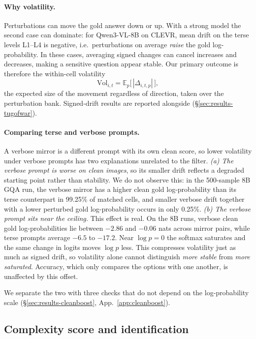 \documentclass[10pt,twocolumn,letterpaper]{article}
\begin{document}
\paragraph{Why volatility.}
Perturbations can move the gold answer down or up. With a strong model
the second case can dominate: for Qwen3-VL-8B on CLEVR, mean drift on the
terse levels L1--L4 is negative, i.e.\ perturbations on average
\emph{raise} the gold log-probability. In these cases, averaging signed changes can cancel increases and decreases, making a sensitive question appear stable. Our
primary outcome is therefore the within-cell volatility
\begin{equation}
  \mathrm{Vol}_{i,t} = \mathbb{E}_p\big[\,|\Delta_{i,t,p}|\,\big],
  \label{eq:vol}
\end{equation}
the expected size of the movement regardless of direction, taken over
the perturbation bank. Signed-drift results are reported alongside
(\S\ref{sec:results-tugofwar}).

\paragraph{Comparing terse and verbose prompts.}\label{sec:confounds}
A verbose mirror is a different prompt with its own clean score, so
lower volatility under verbose prompts has two explanations unrelated
to the filter.
\emph{(a) The verbose prompt is worse on clean images}, so its smaller
drift reflects a degraded starting point rather than stability. We do
not observe this: in the 500-sample 8B GQA run, the verbose mirror has a
higher clean gold log-probability than its terse counterpart in
99.25\% of matched cells, and smaller verbose drift together with a
lower perturbed gold log-probability occurs in only 0.25\%.
\emph{(b) The verbose prompt sits near the ceiling.} This effect is
real. On the 8B runs, verbose clean gold log-probabilities lie between
$-2.86$ and $-0.06$ nats across mirror pairs, while terse prompts
average $-6.5$ to $-17.2$. Near $\log p=0$ the softmax saturates and the
same change in logits moves $\log p$ less. This compresses volatility
just as much as signed drift, so volatility alone cannot distinguish
\emph{more stable} from \emph{more saturated}. Accuracy, which only compares the options with one another, is unaffected by this offset.

We separate the two with three checks that do not depend on the log-probability scale (\S\ref{sec:results-cleanboost}, App.~\ref{app:cleanboost}).

\subsection{Complexity score and identification}
\label{sec:csem}
\end{document}
